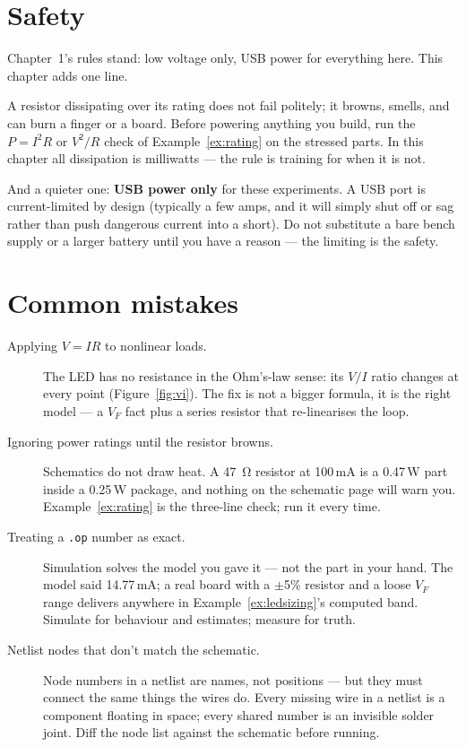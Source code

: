 \section{Safety}
\label{sec:safety2}

Chapter~1's rules stand: low voltage only, USB power for everything here.
This chapter adds one line.

\begin{rulebox}
A resistor dissipating over its rating does not fail politely; it browns,
smells, and can burn a finger or a board. Before powering anything you
build, run the $P=I^2R$ or $V^2/R$ check of Example~\ref{ex:rating} on the
stressed parts. In this chapter all dissipation is milliwatts — the rule is
training for when it is not.
\end{rulebox}

And a quieter one: \textbf{USB power only} for these experiments. A USB port
is current-limited by design (typically a few amps, and it will simply shut
off or sag rather than push dangerous current into a short). Do not
substitute a bare bench supply or a larger battery until you have a reason —
the limiting is the safety.

\section{Common mistakes}
\label{sec:mistakes2}

\begin{description}
\item[Applying $V=IR$ to nonlinear loads.] The LED has no resistance in the
Ohm's-law sense: its $V/I$ ratio changes at every point (Figure~\ref{fig:vi}).
The fix is not a bigger formula, it is the right model — a $V_F$ fact plus a
series resistor that re-linearises the loop.
\item[Ignoring power ratings until the resistor browns.] Schematics do not
draw heat. A \qty{47}{\ohm} resistor at 100\,mA is a 0.47\,W part inside a
0.25\,W package, and nothing on the schematic page will warn you.
Example~\ref{ex:rating} is the three-line check; run it every time.
\item[Treating a \texttt{.op} number as exact.] Simulation solves the model
you gave it — not the part in your hand. The model said 14.77\,mA; a real
board with a $\pm$5\% resistor and a loose $V_F$ range delivers anywhere in
Example~\ref{ex:ledsizing}'s computed band. Simulate for behaviour and
estimates; measure for truth.
\item[Netlist nodes that don't match the schematic.] Node numbers in a
netlist are names, not positions — but they must connect the same things the
wires do. Every missing wire in a netlist is a component floating in space;
every shared number is an invisible solder joint. Diff the node list against
the schematic before running.
\end{description}

